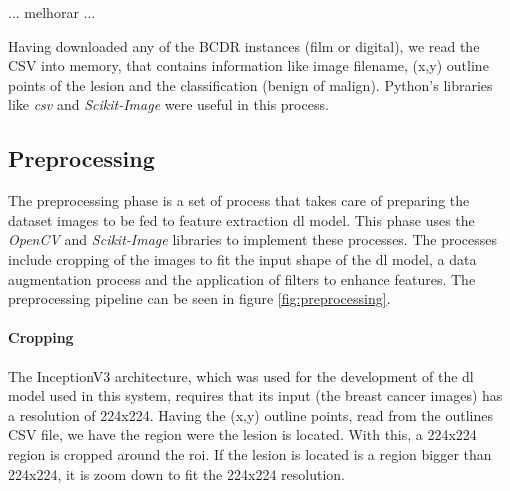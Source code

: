 \documentclass[
  twoside,
  11pt, a4paper,
  footinclude=true,
  headinclude=true,
  cleardoublepage=empty
]{scrbook}
\begin{document}
        ... melhorar ...

        Having downloaded any of the BCDR instances (film or digital), we read the CSV into memory, that contains information like image filename, (x,y) outline points of the lesion and the classification (benign of malign). Python's libraries like \textit{csv} and \textit{Scikit-Image} were useful in this process.

      \subsection{Preprocessing}
        The preprocessing phase is a set of process that takes care of preparing the dataset images to be fed to feature extraction \gls{dl} model. This phase uses the \textit{OpenCV} and \textit{Scikit-Image} libraries to implement these processes. The processes include cropping of the images to fit the input shape of the \gls{dl} model, a data augmentation process and the application of filters to enhance features. The preprocessing pipeline can be seen in figure \ref{fig:preprocessing}.


        \paragraph{Cropping}
          The InceptionV3 architecture, which was used for the development of the \gls{dl} model used in this system, requires that its input (the breast cancer images) has a resolution of 224x224. Having the (x,y) outline points, read from the outlines CSV file, we have the region were the lesion is located. With this, a 224x224 region is cropped around the \gls{roi}. If the lesion is located is a region bigger than 224x224, it is zoom down to fit the 224x224 resolution.
\end{document}
